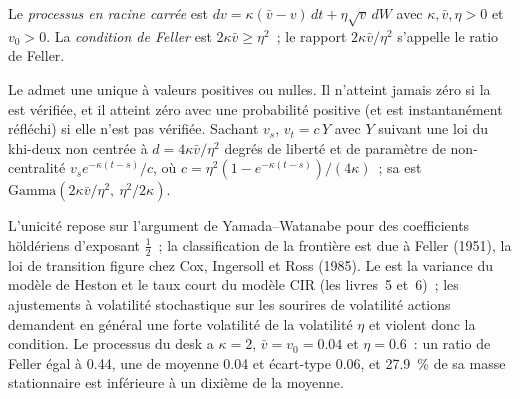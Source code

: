 \begin{definition}\label{def:qm:stochastic-differential-equations:sqrt}
Le \emph{processus en racine carrée} est $dv = \kappa(\bar v - v)\,dt + \eta\sqrt
v\,dW$ avec $\kappa, \bar v, \eta > 0$ et $v_0 > 0$. La \emph{condition
de Feller} est $2\kappa\bar v \ge \eta^2$~; le rapport $2\kappa\bar v/\eta^2$ s'appelle le ratio de Feller.
\end{definition}

\begin{theorem}[Feller]\label{thm:qm:stochastic-differential-equations:feller}
Le  admet une unique  à valeurs positives ou nulles. Il n'atteint jamais zéro si la
 est vérifiée, et il atteint zéro avec une probabilité positive (et est instantanément réfléchi)
si elle n'est pas vérifiée. Sachant $v_s$, $v_t = c\,Y$ avec $Y$ suivant une loi du khi-deux non centrée à $d = 4\kappa\bar
v/\eta^2$ degrés de liberté et de paramètre de non-centralité $v_se^{-\kappa(t-s)}/c$, où $c = \eta^2(1 -
e^{-\kappa(t-s)})/(4\kappa)$~; sa  est $\mathrm{Gamma}(2\kappa\bar v/\eta^2,\ \eta^2/2\kappa)$.
\end{theorem}

\admitted

L'unicité repose sur l'argument de Yamada--Watanabe pour des coefficients höldériens d'exposant $\tfrac12$~; la
classification de la frontière est due à Feller (1951), la loi de transition figure chez Cox, Ingersoll et Ross (1985).
Le  est la variance du modèle de Heston et le taux court du modèle CIR
(les livres~5 et~6)~; les ajustements à volatilité stochastique sur les sourires de volatilité actions demandent en général
une forte volatilité de la volatilité $\eta$ et violent donc la condition. Le processus du desk a $\kappa = 2$, $\bar v =
v_0 = 0.04$ et $\eta = 0.6$~: un ratio de Feller égal à 0.44, une  de moyenne 0.04 et
écart-type 0.06, et 27.9~\% de sa masse stationnaire est inférieure à un dixième de la moyenne.

